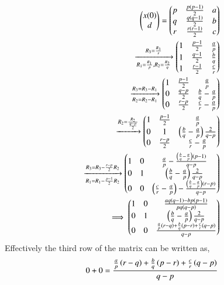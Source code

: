 \documentclass[journal,12pt,twocolumn]{IEEEtran}
\theoremstyle{remark}
\begin{document}
\begin{align}
    \begin{pmatrix}
        x(0)\\
        d\\
    \end{pmatrix}
    =
   \begin{pmatrix}
        p&\frac{p\left(p-1\right)}{2}&a\\
        q&\frac{q\left(q-1\right)}{2}&b\\
        r&\frac{r\left(r-1\right)}{2}&c\\
    \end{pmatrix}\\
    \xrightarrow[R_{1}=\frac{R_{1}}{p}, R_{2}=\frac{R_{2}}{q}]{R_{3}=\frac{R_{3}}{r}} 
    \begin{pmatrix}
        1&\frac{p-1}{2}&\frac{a}{p}\\
        1&\frac{q-1}{2}&\frac{b}{q}\\
        1&\frac{r-1}{2}&\frac{c}{r}\\
    \end{pmatrix}\\
   \xrightarrow[R_{2}=R_{2}-R_{1}]{R_{3}=R_{3}-R_{1}} 
    \begin{pmatrix}
        1&\frac{p-1}{2}&\frac{a}{p}\\
        0&\frac{q-p}{2}&\frac{b}{q}-\frac{a}{p}\\
        0&\frac{r-p}{2}&\frac{c}{r}-\frac{a}{p}\\
    \end{pmatrix}\\
    \xrightarrow{R_2=\frac{R_{2}}{\frac{q-p}{2}}}
    \begin{pmatrix}
        1&\frac{p-1}{2}&\frac{a}{p}\\
        0&1&\left(\frac{b}{q}-\frac{a}{p}\right)\frac{2}{q-p}\\
        0&\frac{r-p}{2}&\frac{c}{r}-\frac{a}{p}\\
    \end{pmatrix}\\
    \xrightarrow[R_{1}=R_{1}-\frac{p-1}{2}R_{2}]{R_{3}=R_{3}-\frac{r-p}{2}R_{2}}
    \begin{pmatrix}
        1&0&\frac{a}{p}-\frac{\left(\frac{b}{q}-\frac{a}{p}\right)\left(p-1\right)}{q-p}\\
        0&1&\left(\frac{b}{q}-\frac{a}{p}\right)\frac{2}{q-p}\\
        0&0&\left(\frac{c}{r}-\frac{a}{p}\right)-\frac{\left(\frac{b}{q}-\frac{a}{p}\right)\left(r-p\right)}{q-p}\\
    \end{pmatrix}\\
    \implies
    \begin{pmatrix}
        1&0&\frac{aq\left(q-1\right)-bp\left(p-1\right)}{pq\left(q-p\right)}\\
        0&1&\left(\frac{b}{q}-\frac{a}{p}\right)\frac{2}{q-p}\\
        0&0&\frac{\frac{a}{p}\left(r-q\right)+\frac{b}{q}\left(p-r\right)+\frac{c}{r}\left(q-p\right)}{q-p}\\
    \end{pmatrix}
\end{align}
Effectively the third row of the matrix can be written as,
\begin{align}
    0+0=\frac{\frac{a}{p}\left(r-q\right)+\frac{b}{q}\left(p-r\right)+\frac{c}{r}\left(q-p\right)}{q-p}
\end{align}
\end{document}
